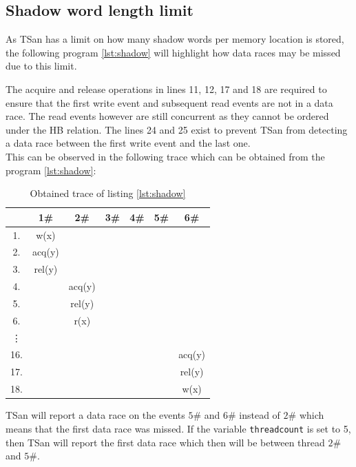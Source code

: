 \documentclass[12pt]{article}
\begin{document}
	\subsection{Shadow word length limit}\label{shadow}
	As TSan has a limit on how many shadow words per memory location is stored, the following program \ref{lst:shadow} will highlight how data races may be missed due to this limit.
	
	The acquire and release operations in lines 11, 12, 17 and 18 are required to ensure that the first write event and subsequent read events are not in a data race. The read events however are still concurrent as they cannot be ordered under the HB relation. The lines 24 and 25 exist to prevent TSan from detecting a data race between the first write event and the last one.\\
	This can be observed in the following trace which can be obtained from the program \ref{lst:shadow}:
	\begin{table}[H]
		\begin{center}
			\begin{tabular}{ c c c c c c c }
				& 1\# & 2\# & 3\# & 4\# & 5\# & 6\# \\
				\hline
				1. & w(x) & & & & & \\
				2. & acq(y) & & & & & \\
				3. & rel(y) & & & & & \\
				4. & & acq(y) & & & & \\
				5. & & rel(y) & & & & \\
				6. & & r(x) & & & & \\
				\vdots & & & & & & \\
				16. & & & & & & acq(y) \\
				17. & & & & & & rel(y) \\
				18. & & & & & & w(x) \\
			\end{tabular}
			\caption{Obtained trace of listing \ref{lst:shadow}}
			\label{trace3}
		\end{center}
	\end{table}
	TSan will report a data race on the events $5\#$ and $6\#$ instead of $2\#$ which means that the first data race was missed. If the variable \texttt{threadcount} is set to 5, then TSan will report the first data race which then will be between thread $2\#$ and $5\#$.
\end{document}
